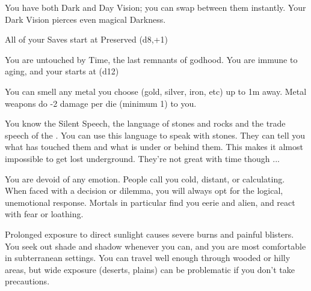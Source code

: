   \newpage



  You have both Dark and Day Vision; you can swap between them instantly.  Your Dark Vision pierces even magical Darkness.


  All of your Saves start at Preserved (d8,+1)


  You are untouched by Time, the last remnants of godhood.  You are immune to aging, and your \DEATH starts at  (d12)  


  You can smell any metal you choose (gold, silver, iron, etc) up to 1m away.  Metal weapons do -2 damage per die (minimum 1) to you.  


  You know the Silent Speech, the language of stones and rocks and the trade speech of the .  You can use this language to speak with stones. They can tell you what has touched them and what is under or behind them.  This makes it almost impossible to get lost underground. They're not great with time though ...








  You are devoid of any emotion.  People call you cold, distant, or calculating.  When faced with a decision or dilemma, you will always opt for the logical, unemotional response.  Mortals in particular find you eerie and alien, and react with fear or loathing.



  Prolonged exposure to direct sunlight causes severe burns and painful blisters.  You seek out shade and shadow whenever you can, and you are most comfortable in subterranean settings.  You can travel well enough through wooded or hilly areas, but wide exposure (deserts, plains) can be problematic if you don't take precautions.


